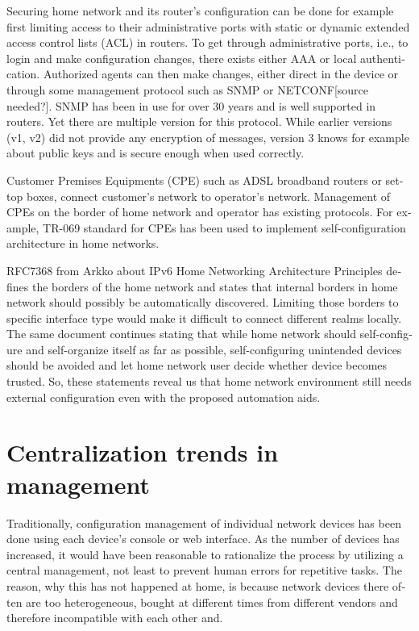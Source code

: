 \documentclass[12pt,a4paper,english]{tutthesis}
\begin{document}
\begin{otherlanguage}{english}
Securing home network and its router's configuration can be done for
example first limiting access to their administrative ports
with static or dynamic extended access control lists (ACL) in
routers. To get through administrative ports, i.e., to login and make
configuration changes, there exists either AAA or local authentication.
Authorized agents can then make changes, either direct in the device or through some
management protocol such as SNMP or NETCONF[source needed?].  SNMP has been in
use for over 30 years and is well supported in routers. Yet there are
multiple version for this protocol. While earlier versions (v1, v2)
did not provide any encryption of messages, version 3 knows for example
about public keys and is secure enough when used correctly.


Customer Premises Equipments (CPE) such as ADSL broadband routers or
set-top boxes, connect customer's network to operator's network.
Management of CPEs on the border of home network and operator has 
existing protocols. For example, TR-069 standard\cite{iptvtr069} for CPEs
has been used to implement self-configuration archi\-tecture in
home networks\cite{tr069rachidi2011}.


RFC7368\cite{rfc7368} from Arkko about IPv6 Home Networking Architecture Principles 
defines the borders of the home network and states that
internal borders in home network should possibly be automatically
discovered. Limiting those borders to specific
interface type would make it difficult to connect different realms locally.
The same document continues stating
that while home network should self-configure and self-organize itself as
far as possible, self-configuring unintended devices should be
avoided and let home network user decide whether device becomes trusted.
So, these statements reveal us that home network environment still needs
external configuration even with the proposed automation aids.

\section{Centralization trends in management}
\label{sec-3-2}

Traditionally, configuration management of individual network devices has been done
using each device's console or web interface.  As the number of
devices has increased, it would have been reasonable to rationalize
the process by utilizing a central management, not least to prevent human
errors for repetitive tasks.  The reason, why this has not happened at
home, is because network devices there often are too heterogeneous, bought at different times from different vendors
and therefore incompatible with each other and.


\end{otherlanguage}
\end{document}
